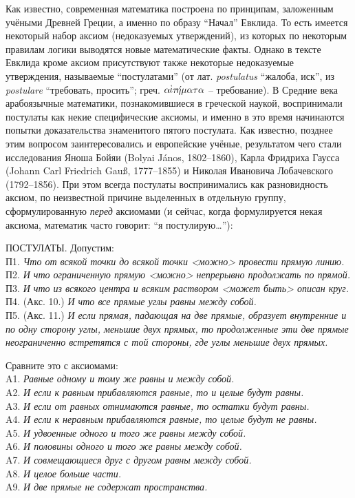 
\vzmscaption

Как известно, современная математика построена по принципам, заложенным учёными Древней Греции, а именно по образу ``Начал'' Евклида.
То есть имеется некоторый набор аксиом (недоказуемых утверждений), из которых по некоторым правилам логики выводятся новые математические факты.
Однако в тексте Евклида кроме аксиом присутствуют также некоторые недоказуемые утверждения, называемые ``пос\-ту\-ла\-та\-ми'' (от лат. {\it pos\-tu\-la\-tus} ``жа\-ло\-ба, иск'',  из {\it po\-s\-tu\-la\-re} ``требовать, просить''; греч. $\alpha\!\!\stackrel{,}{\iota}\!\!\tau\mbox{\'{$\!\!\!\!\eta$}}\mu\alpha\tau\alpha$ -- требование).
В Средние века арабоязычные математики, познакомившиеся в греческой наукой, воспринимали постулаты как некие специфические аксиомы, и именно в это время начинаются попытки доказательства знаменитого пятого постулата.
Как известно, позднее этим вопросом заинтересовались и европейские учёные, результатом чего стали исследования Яно\-ша Бойяи (Bolyai J\'anos, 1802--1860), Карла Фридриха Гаус\-са (Johann Carl Friedrich Gau\ss, 1777--1855) и Николая Ивановича Лобачевского (1792--1856).
При этом всегда постулаты воспринимались как разновидность аксиом, по неизвестной причине выделенных в отдельную группу, сформулированную {\it перед} аксиомами (и сейчас, когда формулируется некая аксиома, математик часто говорит: ``я постулирую\ldots''):

ПОСТУЛАТЫ. Допустим:
\\
П1. {\it Что от всякой точки до всякой точки <можно> провести прямую линию.}
\\
П2. {\it И что ограниченную прямую <можно> непрерывно продолжать по прямой.}
\\
П3. {\it И что из всякого центра и всяким раствором <может быть> описан круг.}
\\
П4. (Акс. 10.) {\it  И что все прямые углы равны между собой.}
\\
П5. (Акс. 11.) {\it  И если прямая, падающая на две прямые, образует внутренние и по одну сторону углы, меньшие двух прямых, то продолженные эти две прямые неограниченно встретятся с той стороны, где углы
меньшие двух прямых.}

Сравните это с аксиомами:
\\
A1. {\it Равные одному и тому же равны и между собой. }
\\
A2. {\it И если к равным прибавляются равные, то и целые будут равны.}
\\
A3. {\it И если от равных отнимаются равные, то остатки будут равны.}
\\
A4. {\it И если к неравным прибавляются равные, то целые будут не равны.}
\\
A5. {\it  И удвоенные одного и того же равны между собой.}
\\
A6. {\it И половины одного и того же равны между собой.}
\\
A7. {\it  И совмещающиеся друг с другом равны между собой.}
\\
A8. {\it И целое больше части.}
\\
A9. {\it И две прямые не содержат пространства.}

